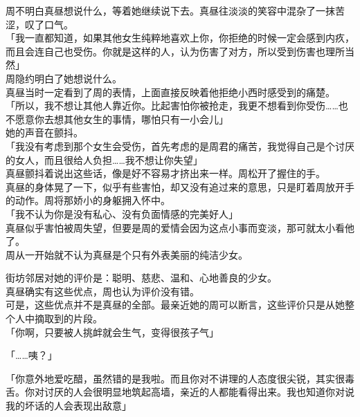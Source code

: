 周不明白真昼想说什么，等着她继续说下去。真昼往淡淡的笑容中混杂了一抹苦涩，叹了口气。\\

「我一直都知道，如果其他女生纯粹地喜欢上你，你拒绝的时候一定会感到内疚，而且会连自己也受伤。你就是这样的人，认为伤害了对方，所以受到伤害也理所当然」\\

周隐约明白了她想说什么。\\

真昼当时一定看到了周的表情，上面直接反映着他拒绝小西时感受到的痛楚。\\

「所以，我不想让其他人靠近你。比起害怕你被抢走，我更不想看到你受伤……也不愿意你去想其他女生的事情，哪怕只有一小会儿」\\

她的声音在颤抖。\\

「我没有考虑到那个女生会受伤，首先考虑的是周君的痛苦，我觉得自己是个讨厌的女人，而且很给人负担……我不想让你失望」\\

真昼颤抖着说出这些话，像是好不容易才挤出来一样。周松开了握住的手。\\

真昼的身体晃了一下，似乎有些害怕，却又没有追过来的意思，只是盯着周放开手的动作。周将那娇小的身躯拥入怀中。\\

「我不认为你是没有私心、没有负面情感的完美好人」\\

真昼似乎害怕被周失望，但要是周的爱情会因为这点小事而变淡，那可就太小看他了。\\

周从一开始就不认为真昼是个只有外表美丽的纯洁少女。

街坊邻居对她的评价是：聪明、慈悲、温和、心地善良的少女。\\

真昼确实有这些优点，周也认为评价没有错。\\

可是，这些优点并不是真昼的全部。最亲近她的周可以断言，这些评价只是从她整个人中摘取到的片段。\\

「你啊，只要被人挑衅就会生气，变得很孩子气」

「……咦？」

「你意外地爱吃醋，虽然错的是我啦。而且你对不讲理的人态度很尖锐，其实很毒舌。你对讨厌的人会很明显地筑起高墙，亲近的人都能看得出来。我也知道你对说我的坏话的人会表现出敌意」

